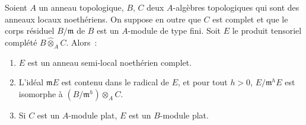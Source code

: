 \begin{lemma}[19.7.1.2]
\label{0.19.7.1.2-fr}
Soient $A$ un anneau topologique, $B$, $C$ deux $A$-algèbres topologiques qui
sont des anneaux locaux noethériens. On suppose en outre que $C$ est complet
et que le corps résiduel $B/\mathfrak m$ de $B$ est un $A$-module de type fini.
Soit $E$ le produit tensoriel complété $B\widehat\otimes_A C$. Alors~:
\begin{enumerate}
  \item[\textup{(i)}] $E$ est un anneau semi-local noethérien complet.
  \item[\textup{(ii)}] L'idéal $\mathfrak mE$ est contenu dans le radical de $E$, et
  pour tout $h>0$, $E/\mathfrak m^hE$ est isomorphe à
  $(B/\mathfrak m^h)\otimes_A C$.
  \item[\textup{(iii)}] Si $C$ est un $A$-module plat, $E$ est un $B$-module plat.
\end{enumerate}
\end{lemma}

